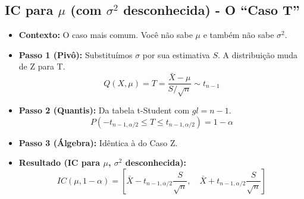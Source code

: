 \documentclass[12pt, a4paper]{article}
\theoremstyle{definition} %
\theoremstyle{remark} %
\begin{document}
\subsection{\texorpdfstring{IC para $\mu$ (com $\sigma^2$ desconhecida) - O ``Caso T''}{IC para mu (com sigma^2 desconhecida) - O ``Caso T''}}
\begin{itemize}
    \item \textbf{Contexto:} O caso mais comum. Você não sabe $\mu$ e também não sabe $\sigma^2$.
    \item \textbf{Passo 1 (Pivô):} Substituímos $\sigma$ por sua estimativa $S$. A distribuição muda de Z para T.
        $$ Q(X, \mu) = T = \frac{\bar{X} - \mu}{S / \sqrt{n}} \sim t_{n-1} $$
    \item \textbf{Passo 2 (Quantis):} Da tabela t-Student com $gl = n-1$.
        $$ P(-t_{n-1, \alpha/2} \le T \le t_{n-1, \alpha/2}) = 1-\alpha $$
    \item \textbf{Passo 3 (Álgebra):} Idêntica à do Caso Z.
    \item \textbf{Resultado (IC para $\mu$, $\sigma^2$ desconhecida):}
        $$ IC(\mu, 1-\alpha) = \left[ \bar{X} - t_{n-1, \alpha/2} \frac{S}{\sqrt{n}}, \quad \bar{X} + t_{n-1, \alpha/2} \frac{S}{\sqrt{n}} \right] $$
\end{itemize}
\end{document}
